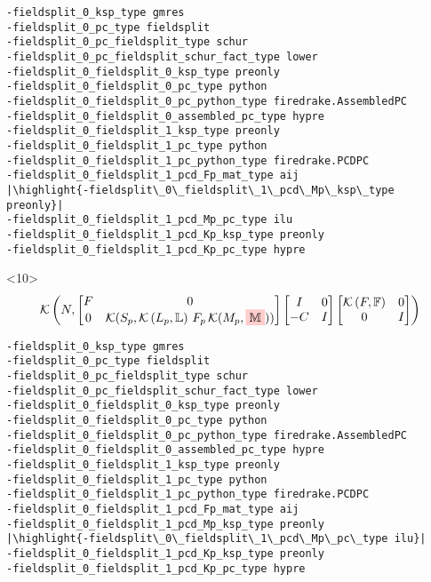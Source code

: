 \documentclass[presentation]{beamer}
\newcommand{\KSP}[2]{\ensuremath{\mathcal{K}\left(#1, \mathbb{#2}\right)}}
\newcommand{\ksp}[1]{\KSP{#1}{#1}}
\newcommand{\highlight}[1]{\colorbox{red!20}{\color{black} #1}}
\begin{document}
\begin{frame}[fragile]
\begin{onlyenv}
\begin{verbatim}
-fieldsplit_0_ksp_type gmres
-fieldsplit_0_pc_type fieldsplit
-fieldsplit_0_pc_fieldsplit_type schur
-fieldsplit_0_pc_fieldsplit_schur_fact_type lower
-fieldsplit_0_fieldsplit_0_ksp_type preonly
-fieldsplit_0_fieldsplit_0_pc_type python
-fieldsplit_0_fieldsplit_0_pc_python_type firedrake.AssembledPC
-fieldsplit_0_fieldsplit_0_assembled_pc_type hypre
-fieldsplit_0_fieldsplit_1_ksp_type preonly
-fieldsplit_0_fieldsplit_1_pc_type python
-fieldsplit_0_fieldsplit_1_pc_python_type firedrake.PCDPC
-fieldsplit_0_fieldsplit_1_pcd_Fp_mat_type aij
|\highlight{-fieldsplit\_0\_fieldsplit\_1\_pcd\_Mp\_ksp\_type preonly}|
-fieldsplit_0_fieldsplit_1_pcd_Mp_pc_type ilu
-fieldsplit_0_fieldsplit_1_pcd_Kp_ksp_type preonly
-fieldsplit_0_fieldsplit_1_pcd_Kp_pc_type hypre
\end{verbatim}
  \end{onlyenv}
  \begin{onlyenv}<10>
    \color{gray}
    \begin{equation*}
      \KSP{N}{%
        \begin{bmatrix}
        F & 0 \\
        0 & \mathcal{K}(S_p, \KSP{L_p}{L}\,F_p \, \mathcal{K}(M_p, \highlight{$\mathbb{M}$}))
      \end{bmatrix}
      \begin{bmatrix}
        I & 0\\
        -C & I
      \end{bmatrix}
      \begin{bmatrix}
        \ksp{F} & 0 \\
        0 & I
      \end{bmatrix}}
    \end{equation*}
\begin{verbatim}
-fieldsplit_0_ksp_type gmres
-fieldsplit_0_pc_type fieldsplit
-fieldsplit_0_pc_fieldsplit_type schur
-fieldsplit_0_pc_fieldsplit_schur_fact_type lower
-fieldsplit_0_fieldsplit_0_ksp_type preonly
-fieldsplit_0_fieldsplit_0_pc_type python
-fieldsplit_0_fieldsplit_0_pc_python_type firedrake.AssembledPC
-fieldsplit_0_fieldsplit_0_assembled_pc_type hypre
-fieldsplit_0_fieldsplit_1_ksp_type preonly
-fieldsplit_0_fieldsplit_1_pc_type python
-fieldsplit_0_fieldsplit_1_pc_python_type firedrake.PCDPC
-fieldsplit_0_fieldsplit_1_pcd_Fp_mat_type aij
-fieldsplit_0_fieldsplit_1_pcd_Mp_ksp_type preonly
|\highlight{-fieldsplit\_0\_fieldsplit\_1\_pcd\_Mp\_pc\_type ilu}|
-fieldsplit_0_fieldsplit_1_pcd_Kp_ksp_type preonly
-fieldsplit_0_fieldsplit_1_pcd_Kp_pc_type hypre

\end{verbatim}
\end{onlyenv}
\end{frame}
\end{document}
